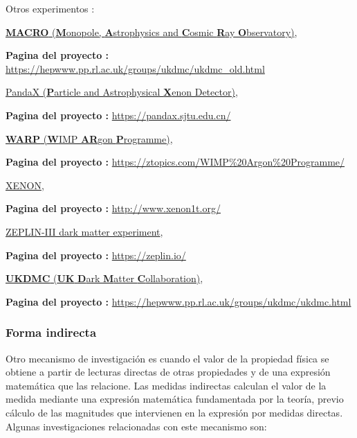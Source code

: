 \begin{itemize_f}
\item[-] Otros experimentos : 
\begin{itemize_f}
\item \href{https://en.wikipedia.org/wiki/Monopole,_Astrophysics_and_Cosmic_Ray_Observatory}{\textbf{MACRO} (\textbf{M}onopole, \textbf{A}strophysics and \textbf{C}osmic \textbf{R}ay \textbf{O}bservatory)}, 

\textbf{Pagina del proyecto :} \url{https://hepwww.pp.rl.ac.uk/groups/ukdmc/ukdmc_old.html}

\item \href{https://en.wikipedia.org/wiki/PandaX}{PandaX (\textbf{P}article and Astrophysical \textbf{X}enon Detector)}, 

\textbf{Pagina del proyecto :} \url{https://pandax.sjtu.edu.cn/}

\item \href{https://en.wikipedia.org/wiki/WIMP_Argon_Programme}{\textbf{WARP} (\textbf{W}IMP \textbf{AR}gon \textbf{P}rogramme)}, 

\textbf{Pagina del proyecto :} \url{https://ztopics.com/WIMP\%20Argon\%20Programme/}

\item \href{https://en.wikipedia.org/wiki/XENON}{XENON}, 

\textbf{Pagina del proyecto :} \url{http://www.xenon1t.org/}

\item \href{https://en.wikipedia.org/wiki/ZEPLIN-III}{ZEPLIN-III dark matter experiment}, 

\textbf{Pagina del proyecto :} \url{https://zeplin.io/}

\item \href{https://en.wikipedia.org/wiki/UK_Dark_Matter_Collaboration}{\textbf{UKDMC} (\textbf{UK} \textbf{D}ark \textbf{M}atter \textbf{C}ollaboration)}, 

\textbf{Pagina del proyecto :} \url{https://hepwww.pp.rl.ac.uk/groups/ukdmc/ukdmc.html}
\end{itemize_f}
\end{itemize_f}


\subsubsection{Forma indirecta}
Otro mecanismo de investigación es cuando el valor de la propiedad física se obtiene a partir de lecturas directas de otras propiedades y de una expresión matemática que las relacione. Las medidas indirectas calculan el valor de la medida mediante una expresión matemática fundamentada por la teoría, previo cálculo de las magnitudes que intervienen en la expresión por medidas directas. Algunas investigaciones relacionadas con este mecanismo son: 

